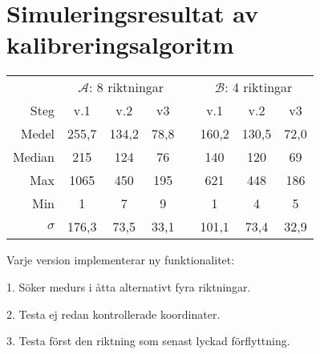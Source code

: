 \section{Simuleringsresultat av kalibreringsalgoritm} %
\label{sec:sokalgoritm_sim}
    \begin{table}[ht]
        \centering
        \begin{threeparttable}
        \begin{tabular}{rccccccc}\toprule
            & \multicolumn{3}{c}{ $\mathscr{A}$: 8 riktningar} &  & \multicolumn{3}{c}{ $\mathscr{B}$: 4 riktingar} \\ %
            \hspace{5mm}    Steg        & v.1   & v.2   & v3    & \hspace{5mm}  & v.1   & v.2   & v3    \\  \midrule
                            Medel       & 255,7 & 134,2 & 78,8  &               & 160,2 & 130,5 & 72,0  \\
                            Median      & 215   & 124   & 76    &               & 140   & 120   & 69    \\
                            Max         & 1065  & 450   & 195   &               & 621   & 448   & 186   \\
                            Min         & 1     & 7     & 9     &               & 1     & 4     & 5     \\
                            $\sigma$    & 176,3 & 73,5  & 33,1  &               & 101,1 & 73,4  & 32,9  \\  \bottomrule
        \end{tabular}
        \begin{tablenotes}
            \item Varje version implementerar ny funktionalitet:
            \item 1. Söker medurs i åtta alternativt fyra riktningar.
            \item 2. Testa ej redan kontrollerade koordinater.
            \item 3. Testa först den riktning som senast lyckad förflyttning.
        \end{tablenotes}
        \end{threeparttable}
    \end{table} \bigskip


